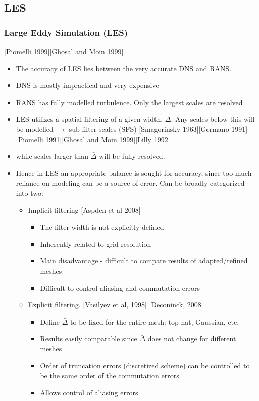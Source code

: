 \documentclass{beamer}
\begin{document}
\subsection{LES}
\begin{frame}
\frametitle{Large Eddy Simulation (LES)}
\scriptsize
[Piomelli 1999][Ghosal and Moin 1999]
\begin{itemize}
\item The accuracy of LES lies between the very accurate DNS and RANS.
\item DNS is mostly impractical and very expensive
\item RANS has fully modelled turbulence. Only the largest scales are resolved
\item LES utilizes a spatial filtering of a given width, $\bar{\Delta} $. Any scales below this will be modelled $\rightarrow$ sub-filter scales (SFS) [Smagorinsky 1963][Germano 1991][Piomelli 1991][Ghosal and Moin 1999][Lilly 1992]
\item while scales larger than $\bar{\Delta}$ will be fully resolved.

\item Hence in LES an appropriate balance is sought for accuracy, since too much reliance on modeling can be a source of error. Can be broadly categorized into two:

\begin{itemize}
\tiny
\item Implicit filtering [Aspden et al 2008]
\begin{itemize}
\tiny
\item The filter width is not explicitly defined
\item Inherently related to grid resolution
\item Main disadvantage - difficult to compare results of adapted/refined meshes
\item Difficult to control aliasing and commutation errors
\end{itemize}


\item Explicit filtering. [Vasilyev et al, 1998] [Deconinck, 2008]
\begin{itemize}
\tiny
\item Define $\bar{\Delta} $ to be fixed for the entire mesh: top-hat, Gaussian, etc.
\item Results easily comparable since $\bar{\Delta} $ does not change for different meshes
\item Order of truncation errors (discretized scheme) can be controlled to be the same order of the commutation errors
\item Allows control of aliasing errors
\end{itemize}

\end{itemize}

\end{itemize}
\end{frame}
\end{document}
